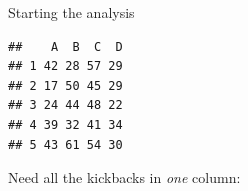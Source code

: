\begin{frame}[fragile]{Starting the analysis}
  
\begin{knitrout}
\color{fgcolor}\begin{kframe}
\begin{alltt}
\hlkwb{=}\hlstd{(}\hlstd{,}
\end{alltt}
\begin{verbatim}
##    A  B  C  D
## 1 42 28 57 29
## 2 17 50 45 29
## 3 24 44 48 22
## 4 39 32 41 34
## 5 43 61 54 30
\end{verbatim}
\end{kframe}
\end{knitrout}

Need all the kickbacks in \emph{one} column:

\begin{knitrout}
\color{fgcolor}\begin{kframe}
\begin{alltt}
\hlkwb{=}\hlopt{:}
\end{alltt}
\end{kframe}
\end{knitrout}
  
\end{frame}

